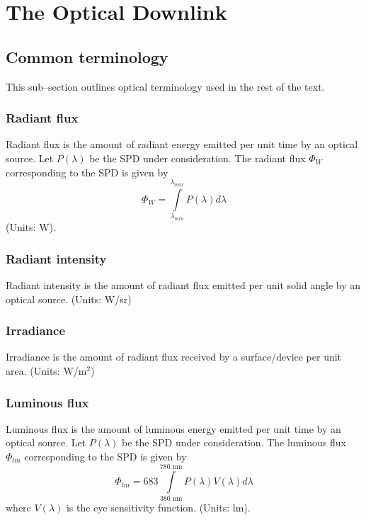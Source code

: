 \section{The Optical Downlink}
\label{sec:outline}
\graphicspath{{_Intro/Figures/}}

\subsection{Common terminology}
\label{subsec:outlineTerminology}
This sub--section outlines optical terminology used in the rest of the text.
\subsubsection{Radiant flux}
\label{subsubsec:radiantFlux}
Radiant flux is the amount of radiant energy emitted per unit time by an optical source. Let $P(\lambda)$ be the SPD under consideration. The radiant flux $\Phi_{W}$ corresponding to the SPD is given by 
\begin{equation}
	\Phi_{W} = \int\limits_{\lambda_{min}}^{\lambda_{max}}P(\lambda)d\lambda
	\label{eqRadiantFlux}
\end{equation}
(Units: W).

\subsubsection{Radiant intensity}
\label{subsubsec:radiantIntensity}
Radiant intensity is the amount of radiant flux emitted per unit solid angle by an optical source. (Units: W/sr)

\subsubsection{Irradiance}
\label{subsubsec:irradiance}
Irradiance is the amount of radiant flux received by a surface/device per unit area. (Units: W/m$^{2}$)

\subsubsection{Luminous flux}
\label{subsubsec:luminousFlux}
Luminous flux is the amount of luminous energy emitted per unit time by an optical source. Let $P(\lambda)$ be the SPD under consideration. The luminous flux $\Phi_{lm}$ corresponding to the SPD is given by \cite{gru08b}
\begin{equation}
	\Phi_{lm} = 683\int\limits_{380\text{ nm}}^{780\text{ nm}}P(\lambda)V(\lambda)d\lambda
	\label{eqLuminousFlux}
\end{equation}
where $V(\lambda)$ is the eye sensitivity function. (Units: lm).

